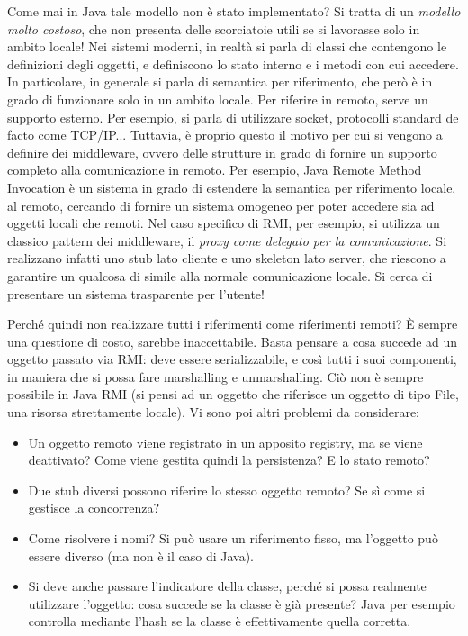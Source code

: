 Come mai in Java tale modello non è stato implementato? Si tratta di un
\textit{modello molto costoso}, che non presenta delle scorciatoie utili se si
lavorasse solo in ambito locale!
Nei sistemi moderni, in realtà si parla di classi che contengono le definizioni
degli oggetti, e definiscono lo stato interno e i metodi con cui accedere. In
particolare, in generale si parla di semantica per riferimento, che però è in
grado di funzionare solo in un ambito locale. Per riferire in remoto, serve un
supporto esterno. Per esempio, si parla di utilizzare socket, protocolli
standard de facto come TCP/IP...
Tuttavia, è proprio questo il motivo per cui si vengono a definire dei middleware, ovvero delle strutture in grado di
fornire un supporto completo alla comunicazione in remoto. Per esempio, Java Remote Method Invocation è un sistema in
grado di estendere la semantica per riferimento locale, al remoto, cercando di fornire un sistema omogeneo per poter
accedere sia ad oggetti locali che remoti. Nel caso specifico di RMI, per esempio, si utilizza un classico pattern dei
middleware, il \textit{proxy come delegato per la comunicazione}. Si realizzano
infatti uno stub lato cliente e uno skeleton lato
server, che riescono a garantire un qualcosa di simile alla normale comunicazione locale. Si cerca di presentare
un sistema trasparente per l'utente!

Perché quindi non realizzare tutti i riferimenti come riferimenti remoti? È sempre una questione di costo, sarebbe
inaccettabile. Basta pensare a cosa succede ad un oggetto passato via RMI: deve essere serializzabile, e così tutti
i suoi componenti, in maniera che si possa fare marshalling e unmarshalling.
Ciò non è sempre possibile in Java RMI (si pensi ad un oggetto che riferisce un oggetto di tipo File, una risorsa
strettamente locale). Vi sono poi altri problemi da considerare:

\begin{itemize}
 \item Un oggetto remoto viene registrato in un apposito registry, ma se
 viene deattivato? Come viene gestita quindi la persistenza? E lo stato remoto?
 \item Due stub diversi possono riferire lo stesso oggetto remoto? Se sì come si
 gestisce la concorrenza?
 \item Come risolvere i nomi? Si può usare un riferimento fisso, ma l'oggetto
 può essere diverso (ma non è il caso di Java).
 \item Si deve anche passare l'indicatore della classe, perché si possa realmente utilizzare l'oggetto: cosa succede
 se la classe è già presente? Java per esempio controlla mediante l'hash se la classe è effettivamente quella corretta.
\end{itemize}

